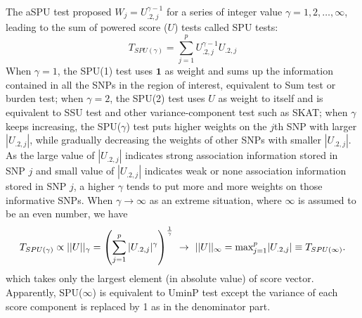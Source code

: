 \documentclass[12pt]{article}
\begin{document}
The aSPU test proposed
$W_j = U_{.2, j} ^ { \gamma - 1}$
for a series of integer value $\gamma = 1,2,\ldots,\infty$, leading to the sum of powered score ($U$) tests called SPU tests:
$$
T_{ SPU ( \gamma ) } = \sum_{j=1}^p U_{.2, j} ^ { \gamma - 1} U_{.2, j}
$$
When $\gamma = 1$, the SPU(1) test uses $\textbf{1}$ as weight and sums up the information contained in all the SNPs in the region of interest, equivalent to Sum test or burden test; when $\gamma = 2$, the SPU(2) test uses $U$ as weight to itself and is equivalent to SSU test and other variance-component test such as SKAT; when $\gamma$ keeps increasing, the SPU($\gamma$) test puts higher weights on the $j$th SNP with larger $|U_{.2,j}|$, while gradually decreasing the weights of other SNPs with smaller $|U_{.2,j}|$. As the large value of $|U_{.2,j}|$ indicates strong association information stored in SNP $j$ and small value of $|U_{.2,j}|$ indicates weak or none association information stored in SNP $j$, a higher $\gamma$ tends to put more and more weights on those informative SNPs. When $\gamma \rightarrow \infty$ as an extreme situation, where $\infty$ is assumed to be an even number, we have
$$
T_{ SPU(\gamma) } \propto ||U||_{\gamma} = \left( \sum_{j=1}^p |U_{.2, j}| ^ { \gamma } \right) ^ { 1 \over \gamma } \ \rightarrow \ ||U||_{\infty} = \textrm{max}_{j=1} ^ p |U_{.2, j}| \equiv T_{ SPU(\infty) }.
$$ 
which takes only the largest element (in absolute value) of score vector. Apparently, SPU($\infty$) is equivalent to UminP test except the variance of each score component is replaced by 1 as in the denominator part.
\end{document}
